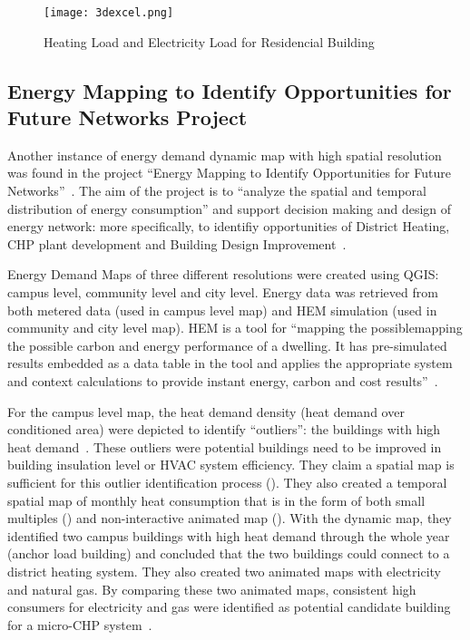 \begin{figure}[h!]
  \centering
  \texttt{[image: 3dexcel.png]}
  \caption[Heating/Electricity Residential]{Heating Load and
    Electricity Load for Residencial Building~\cite{baird2014}}
  \label{fig:3dexcel}
\end{figure}

\subsection{Energy Mapping to Identify Opportunities for Future
  Networks Project}
Another instance of energy demand dynamic map with high spatial
resolution was found in the project ``Energy Mapping to Identify
Opportunities for Future Networks''~\cite{Diaz2013}. The aim of the
project is to ``analyze the spatial and temporal distribution of
energy consumption'' and support decision making and design of energy
network: more specifically, to identifiy opportunities of District
Heating, CHP plant development and Building Design
Improvement~\cite{Diaz2013}.

Energy Demand Maps of three different resolutions were created using
QGIS: campus level, community level and city level. Energy data was
retrieved from both metered data (used in campus level map) and HEM
simulation (used in community and city level map). HEM is a tool for
``mapping the possiblemapping the possible carbon and energy
performance of a dwelling. It has pre-simulated results embedded as a
data table in the tool and applies the appropriate system and context
calculations to provide instant energy, carbon and cost results''~\cite{HEMesru2015}.

For the campus level map, the heat demand density (heat demand over
conditioned area) were depicted to identify ``outliers'': the
buildings with high heat demand~\cite{Diaz2013campus}. These outliers
were potential buildings need to be improved in building insulation
level or HVAC system efficiency. They claim a spatial map is
sufficient for this outlier identification process
(). They also created a temporal spatial map of
monthly heat consumption that is in the form of both small multiples
() and non-interactive animated map
(). With the dynamic map, they identified
two campus buildings with high heat demand through the whole year
(anchor load building) and concluded that the two buildings could
connect to a district heating system. They also created two animated
maps with electricity and natural gas. By comparing these two animated
maps, consistent high consumers for electricity and gas were
identified as potential candidate building for a micro-CHP
system~\cite{microCHP}.


